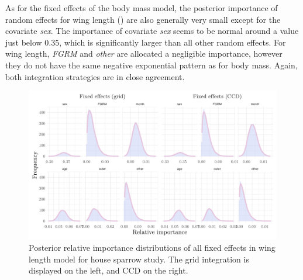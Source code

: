 As for the fixed effects of the body mass model, the posterior importance of random effects for wing length () are also generally very small except for the covariate \textit{sex}. The importance of covariate \textit{sex} seems to be normal around a value just below $0.35$, which is significantly larger than all other random effects. For wing length, \textit{FGRM} and \textit{other} are allocated a negligible importance, however they do not have the same negative exponential pattern as for body mass. Again, both integration strategies are in close agreement.
\begin{figure}[H]%
  \centering
  \includegraphics[width=1\linewidth]{Figures/House sparrow study/Wing_fixed.png}
  \caption[Posterior relative importance distributions of all fixed effects in wing length model for house sparrow study]{Posterior relative importance distributions of all fixed effects in wing length model for house sparrow study. The grid integration is displayed on the left, and CCD on the right.}
  \label{fig:wing_fixed_sparrows}
\end{figure}

